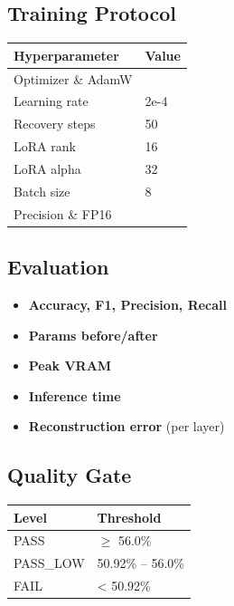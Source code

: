 \subsection{Training Protocol}

\begin{table}[H]
\centering
\small
\begin{tabular}{ll}
\toprule
\textbf{Hyperparameter} & \textbf{Value} \\
\midrule
Optimizer \& AdamW \\
Learning rate & 2e-4 \\
Recovery steps & 50 \\
LoRA rank & 16 \\
LoRA alpha & 32 \\
Batch size & 8 \\
Precision \& FP16 \\
\bottomrule
\end{tabular}
\end{table}

\subsection{Evaluation}

\begin{itemize}
\item \textbf{Accuracy, F1, Precision, Recall}
\item \textbf{Params before/after}
\item \textbf{Peak VRAM}
\item \textbf{Inference time}
\item \textbf{Reconstruction error} (per layer)

\end{itemize}
\subsection{Quality Gate}

\begin{table}[H]
\centering
\small
\begin{tabular}{ll}
\toprule
\textbf{Level} & \textbf{Threshold} \\
\midrule
PASS & $\ge$ 56.0\% \\
PASS\_LOW & 50.92\% -- 56.0\% \\
FAIL & < 50.92\% \\
\bottomrule
\end{tabular}
\end{table}

